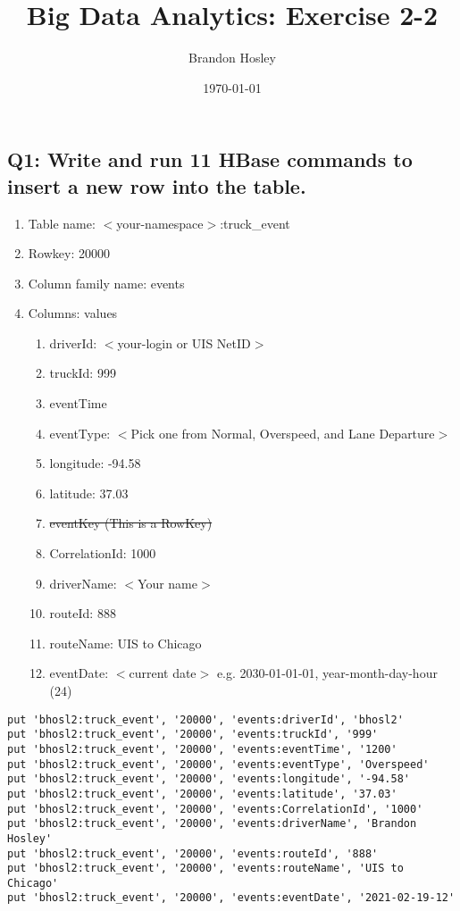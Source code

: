 \documentclass[]{article}
\title{Big Data Analytics: Exercise 2-2}
\author{Brandon Hosley}
\date{\today}
\begin{document}
\maketitle

\subsection*{Q1: Write and run 11 HBase commands to insert a new row into the table.} 
\begin{enumerate}[before=\itshape,font=\normalfont,label=\alph*.]
	\item Table name: $<$your-namespace$>$:truck\_event
	\item Rowkey: 20000
	\item Column family name: events
	\item Columns: values
	\begin{enumerate}[label=\roman*.]
		\item driverId: $<$your-login or UIS NetID$>$
		\item truckId: 999
		\item eventTime
		\item eventType: $<$Pick one from Normal, Overspeed, and Lane Departure$>$
		\item longitude: -94.58
		\item latitude: 37.03
		\item \sout{ eventKey (This is a RowKey) }
		\item CorrelationId: 1000
		\item driverName: $<$Your name$>$
		\item routeId: 888
		\item routeName: UIS to Chicago
		\item eventDate: $<$current date$>$ e.g. 2030-01-01-01, year-month-day-hour (24)
	\end{enumerate}
\end{enumerate}

\begin{verbatim}
put 'bhosl2:truck_event', '20000', 'events:driverId', 'bhosl2'
put 'bhosl2:truck_event', '20000', 'events:truckId', '999'
put 'bhosl2:truck_event', '20000', 'events:eventTime', '1200'
put 'bhosl2:truck_event', '20000', 'events:eventType', 'Overspeed'
put 'bhosl2:truck_event', '20000', 'events:longitude', '-94.58'
put 'bhosl2:truck_event', '20000', 'events:latitude', '37.03'
put 'bhosl2:truck_event', '20000', 'events:CorrelationId', '1000'
put 'bhosl2:truck_event', '20000', 'events:driverName', 'Brandon Hosley'
put 'bhosl2:truck_event', '20000', 'events:routeId', '888'
put 'bhosl2:truck_event', '20000', 'events:routeName', 'UIS to Chicago'
put 'bhosl2:truck_event', '20000', 'events:eventDate', '2021-02-19-12'
\end{verbatim}
\end{document}
